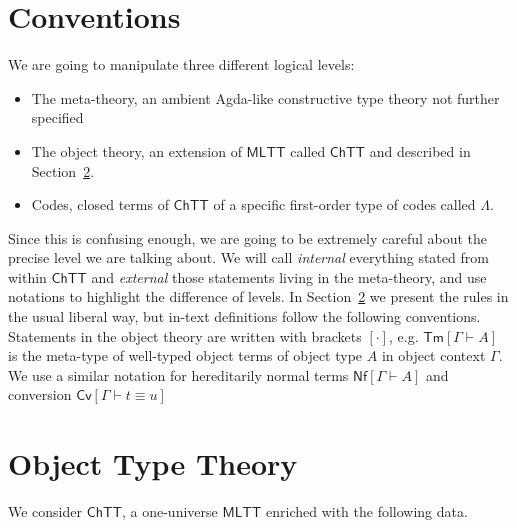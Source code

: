 \documentclass{article}
\newcommand{\MLTT}{\ensuremath{\mathsf{MLTT}}}
\newcommand{\CTTT}{\ensuremath{\mathsf{ChTT}}}
\newcommand{\Trm}[2]{\mathsf{Tm}[{{#1} \vdash {#2}}]}
\newcommand{\TNf}[2]{ {\mathsf{Nf}}[{{#1} \vdash {#2}}]}
\newcommand{\TEq}[3]{ {\mathsf{Cv}}[{{#1} \vdash {#2} \equiv {#3}}]}
\newcommand{\Code}{\Lambda}
\begin{document}
\section{Conventions}

We are going to manipulate three different logical levels:
\begin{itemize}
 \item The meta-theory, an ambient Agda-like constructive type theory not further specified
 \item The object theory, an extension of $\MLTT$ called $\CTTT$ and described in Section~\ref{CTTT}.
 \item Codes, closed terms of $\CTTT$ of a specific first-order type of codes called $\Code$.
\end{itemize}

Since this is confusing enough, we are going to be extremely careful about the precise level we are talking about. We will call \emph{internal} everything stated from within $\CTTT$ and \emph{external} those statements living in the meta-theory, and use notations to highlight the difference of levels. In Section~\ref{CTTT} we present the rules in the usual liberal way, but in-text definitions follow the following conventions. Statements in the object theory are written with brackets $[\cdot]$, e.g.
$\Trm{\Gamma}{A}$ is the meta-type of well-typed object terms of object type $A$ in object context $\Gamma$. We use a similar notation for hereditarily normal terms $\TNf{\Gamma}{A}$ and conversion $\TEq{\Gamma}{t}{u}$

\section{Object Type Theory}\label{CTTT}

We consider $\CTTT$, a one-universe $\MLTT$ enriched with the following data.\bigskip
\end{document}
